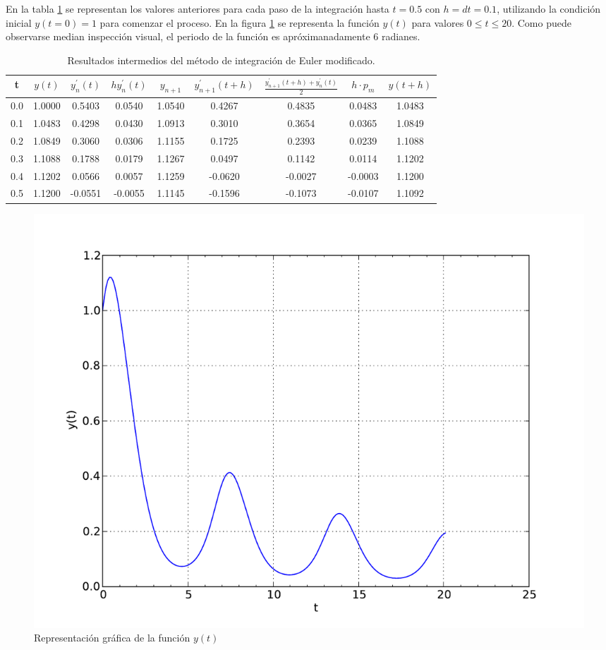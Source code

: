 \documentclass[a4paper, 12pt]{article}
\begin{document}
En la tabla \ref{tab:resultados} se representan los valores anteriores para cada
paso de la integración hasta $t=0.5$ con $h=dt=0.1$, utilizando la condición
inicial $y(t = 0) = 1$ para comenzar el proceso. En la figura \ref{fig:grafica}
se representa la función $y(t)$ para valores $ 0 \leq t \leq 20$.
Como puede observarse median inspección visual, el periodo de la función es
apróximanadamente 6 radianes.

\begin{table}
\begin{center}
\begin{tabular}{|c|c|c|c|c|c|c|c|c|}
\hline
 t & $y(t)$ & $y^{'}_n(t)$ & $hy^{'}_n(t)$ & $y_{n+1}$ & $y^{'}_{n+1}(t+h)$ & $\frac{y^{'}_{n+1}(t+h) + y^{'}_{n}(t)}{2}$
 & $h \cdot p_{m}$ & $y(t+h)$\\
 \hline\hline
0.0  &  1.0000  &  0.5403  &  0.0540  & 1.0540  &  0.4267   & 0.4835   &  0.0483  &  1.0483\\ \hline
0.1  &  1.0483  &  0.4298  &  0.0430  &  1.0913 &   0.3010  &  0.3654  &   0.0365 &   1.0849\\ \hline
0.2  &  1.0849  &  0.3060  &  0.0306  &  1.1155 &   0.1725  &  0.2393  &   0.0239 &   1.1088\\ \hline
0.3  &  1.1088  &  0.1788  &  0.0179  &  1.1267 &   0.0497  &  0.1142  &  0.0114  &  1.1202\\ \hline
0.4  &  1.1202  &  0.0566  &  0.0057  &  1.1259 &   -0.0620 &  -0.0027 &  -0.0003 &  1.1200\\ \hline
0.5  &  1.1200  &  -0.0551 &  -0.0055 &  1.1145 &   -0.1596 &  -0.1073 &  -0.0107 &  1.1092\\ \hline

\end{tabular}
\end{center}
\caption{Resultados intermedios del método de integración de Euler modificado.}
\label{tab:resultados}
\end{table}

\begin{figure}
\begin{center}
\includegraphics[width=0.65\linewidth]{grafica}
\end{center}
\caption{Representación gráfica de la función $y(t)$}
\label{fig:grafica}
\end{figure}
\end{document}
